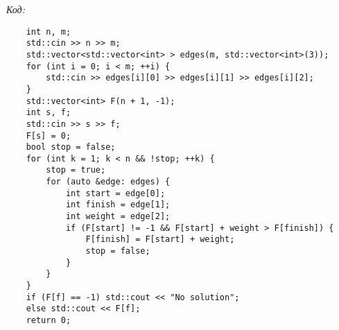 \textit{Код:}
\tiny
\begin{center}
    \begin{verbatim}
    int n, m;
    std::cin >> n >> m;
    std::vector<std::vector<int> > edges(m, std::vector<int>(3));
    for (int i = 0; i < m; ++i) {
        std::cin >> edges[i][0] >> edges[i][1] >> edges[i][2];
    }
    std::vector<int> F(n + 1, -1);
    int s, f;
    std::cin >> s >> f;
    F[s] = 0;
    bool stop = false;
    for (int k = 1; k < n && !stop; ++k) {
        stop = true;
        for (auto &edge: edges) {
            int start = edge[0];
            int finish = edge[1];
            int weight = edge[2];
            if (F[start] != -1 && F[start] + weight > F[finish]) {
                F[finish] = F[start] + weight;
                stop = false;
            }
        }
    }
    if (F[f] == -1) std::cout << "No solution";
    else std::cout << F[f];
    return 0;
    \end{verbatim}
\end{center}
